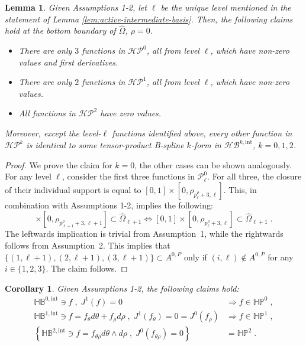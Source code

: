 \documentclass[10pt]{article}
\newcommand{\basis}[1]{\mathcal{#1}}
\newcommand{\vSpace}[1]{\mathbb{#1}}
\newcommand{\tpDomain}{\widehat{\Omega}}
\newcommand{\cU}{\theta}
\newcommand{\cV}{\rho}
\newcommand{\dcU}{\mathit{d\cU}}
\newcommand{\dcV}{\mathit{d\cV}}
\newcommand{\degV}{p^\cV}
\newcommand{\bsp}{B}
\newcommand{\polar}{P}
\newcommand{\polarB}{\basis{\polar}}
\newcommand{\jet}[2]{J^{#1}\left(#2\right)}
\newcommand{\tint}{\mathrm{int}}
\newcommand{\hSpace}[1]{\mathit{\vSpace{H}\vSpace{#1}}}
\newcommand{\hBasis}[1]{\mathit{\basis{H}\basis{#1}}}
\newcommand{\activeS}[2]{A^{#1}_{#2}}
\theoremstyle{plain}
\newtheorem{lemma}{Lemma}[section]
\newtheorem{corollary}{Corollary}[section]
\theoremstyle{definition}
\theoremstyle{remark}
\begin{document}
\begin{lemma}\label{lem:active-polar-basis}
    Given Assumptions 1-2, let $\ell$ be the unique level mentioned in the statement of Lemma \ref{lem:active-intermediate-basis}.
    Then, the following claims hold at the bottom boundary of $\tpDomain$, $\cV = 0$.
    \begin{itemize}
        \item There are only $3$ functions in $\hBasis{\polar}^0$, all from level $\ell$, which have non-zero values and first derivatives.
        \item There are only $2$ functions in $\hBasis{\polar}^1$, all from level $\ell$, which have non-zero values.
        \item All functions in $\hBasis{\polar}^2$ have zero values.
    \end{itemize}
Moreover, except the level-$\ell$ functions identified above, every other function in $\hBasis{\polar}^k$ is identical to some tensor-product B-spline $k$-form in $\hBasis{\bsp}^{k,\tint}$, $k = 0, 1, 2$.
\end{lemma}
\begin{proof}
    We prove the claim for $k = 0$, the other cases can be shown analogously.
    For any level $\ell$, consider the first three functions in $\polarB^0_\ell$.
    For all three, the closure of their individual support is equal to $[0,1] \times [0, \cV_{\degV_\ell+3, \ell}]$.
    This, in combination with Assumptions 1-2, implies the following: 
    \begin{equation*}
        [0,1] \times [0, \cV_{\degV_{\ell+1}+3, \ell+1}] \subset \tpDomain_{\ell+1} \Longleftrightarrow [0,1] \times [0, \cV_{\degV_\ell+3, \ell}] \subset \tpDomain_{\ell+1}\;.
    \end{equation*}
	The leftwards implication is trivial from Assumption~1, while the rightwards follows from Assumption~2.
    This implies that $\{(1,\ell+1),(2,\ell+1),(3,\ell+1)\} \subset \activeS{0,\polar}{}$ only if $(i,\ell) \notin \activeS{0,\polar}{}$ for any $i \in \{1, 2, 3\}$.
    The claim follows.
\end{proof}

\begin{corollary}\label{cor:similarities-hb-hp}
    Given Assumptions 1-2, the following claims hold:
    \begin{align}
        \hSpace{\bsp}^{0,\tint} \ni f \;,\; \jet{1}{f} = 0 &\Longrightarrow f \in \hSpace{\polar}^0\;,\\
        \hSpace{\bsp}^{1,\tint} \ni f = f_\cU\dcU + f_\cV\dcV \;,\; \jet{1}{f_\cU} = 0 = \jet{0}{f_\cV} &\Longrightarrow f \in \hSpace{\polar}^1\;,\\
        \left\{\hSpace{\bsp}^{2,\tint} \ni f = f_{\cU\cV}\dcU\wedge\dcV \;,\; \jet{0}{f_{\cU\cV}} = 0\right\} &= \hSpace{\polar}^2\;.
    \end{align}
\end{corollary}
\end{document}
